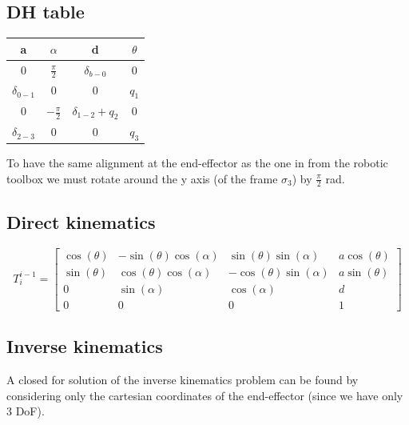 \documentclass{article}
\begin{document}
\subsection{DH table}

\setlength{\tabcolsep}{10pt} %
\renewcommand{\arraystretch}{1.8}
\begin{center}
    \begin{tabular}{ |c|c|c|c| }
        \hline
        a              & $\alpha$         & d                    & $\theta$ \\
        \hline
        0              & $\frac{\pi}{2}$  & $\delta_{b-0}$       & 0        \\
        $\delta_{0-1}$ & 0                & 0                    & $q_1$    \\
        0              & $-\frac{\pi}{2}$ & $\delta_{1-2} + q_2$ & 0        \\
        $\delta_{2-3}$ & 0                & 0                    & $q_3$    \\
        \hline
    \end{tabular}
\end{center}

To have the same alignment at the end-effector as the one in from the robotic toolbox we must rotate around the y axis (of the frame $\sigma_3$) by $\frac{\pi}{2}$ rad.

\subsection{Direct kinematics}



\begin{equation}
    T_{i}^{i-1} = \begin{bmatrix}
        \cos(\theta) & -\sin(\theta)\cos(\alpha) & \sin(\theta)\sin(\alpha)  & a\cos(\theta) \\
        \sin(\theta) & \cos(\theta)\cos(\alpha)  & -\cos(\theta)\sin(\alpha) & a\sin(\theta) \\
        0            & \sin(\alpha)              & \cos(\alpha)              & d             \\
        0            & 0                         & 0                         & 1
    \end{bmatrix}
    \label{eq:homogenous_transformation_mat}
\end{equation}

\subsection{Inverse kinematics}
A closed for solution of the inverse kinematics problem can be found by considering only the cartesian coordinates of the end-effector (since we have only 3 DoF).
\end{document}
